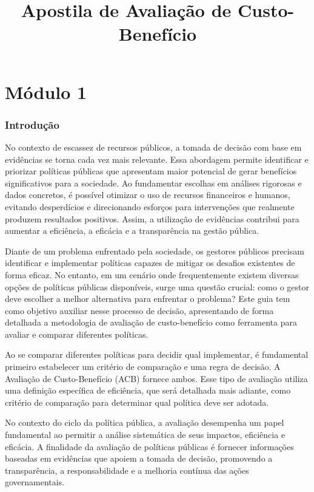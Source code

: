 \documentclass[12pt,letterpaper]{article}
\title{\Huge Apostila de Avaliação de Custo-Benefício}
\author{}
\newcommand{\1}{\mathbbm{1}}
\numberwithin{equation}{section}
\begin{document}
\maketitle
\tableofcontents
\newpage
\part*{Módulo 1}

\section{Introdução}
\label{sec:introducao}

No contexto de escassez de recursos públicos, a tomada de decisão com base em evidências se torna cada vez mais relevante. Essa abordagem permite identificar e priorizar políticas públicas que apresentam maior potencial de gerar benefícios significativos para a sociedade. Ao fundamentar escolhas em análises rigorosas e dados concretos, é possível otimizar o uso de recursos financeiros e humanos, evitando desperdícios e direcionando esforços para intervenções que realmente produzem resultados positivos. Assim, a utilização de evidências contribui para aumentar a eficiência, a eficácia e a transparência na gestão pública.

Diante de um problema enfrentado pela sociedade, os gestores públicos precisam identificar e implementar políticas capazes de mitigar os desafios existentes de forma eficaz. No entanto, em um cenário onde frequentemente existem diversas opções de políticas públicas disponíveis, surge uma questão crucial: como o gestor deve escolher a melhor alternativa para enfrentar o problema? Este guia tem como objetivo auxiliar nesse processo de decisão, apresentando de forma detalhada a metodologia de avaliação de custo-benefício como ferramenta para avaliar e comparar diferentes políticas.

Ao se comparar diferentes políticas para decidir qual implementar, é fundamental primeiro estabelecer um critério de comparação e uma regra de decisão. A Avaliação de Custo-Benefício (ACB) fornece ambos. Esse tipo de avaliação utiliza uma definição específica de eficiência, que será detalhada mais adiante, como critério de comparação para determinar qual política deve ser adotada.

No contexto do ciclo da política pública, a avaliação desempenha um papel fundamental ao permitir a análise sistemática de seus impactos, eficiência e eficácia. A finalidade da avaliação de políticas públicas é fornecer informações baseadas em evidências que apoiem a tomada de decisão, promovendo a transparência, a responsabilidade e a melhoria contínua das ações governamentais.
\end{document}

